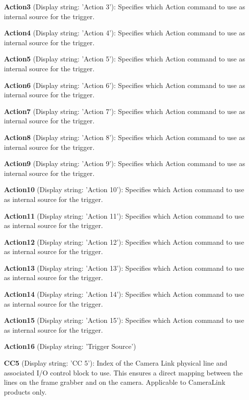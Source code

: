 \begin{DoxyItemize}
\item {\bfseries Action3} (Display string\+: 'Action 3')\+: Specifies which Action command to use as internal source for the trigger.
\item {\bfseries Action4} (Display string\+: 'Action 4')\+: Specifies which Action command to use as internal source for the trigger.
\item {\bfseries Action5} (Display string\+: 'Action 5')\+: Specifies which Action command to use as internal source for the trigger.
\item {\bfseries Action6} (Display string\+: 'Action 6')\+: Specifies which Action command to use as internal source for the trigger.
\item {\bfseries Action7} (Display string\+: 'Action 7')\+: Specifies which Action command to use as internal source for the trigger.
\item {\bfseries Action8} (Display string\+: 'Action 8')\+: Specifies which Action command to use as internal source for the trigger.
\item {\bfseries Action9} (Display string\+: 'Action 9')\+: Specifies which Action command to use as internal source for the trigger.
\item {\bfseries Action10} (Display string\+: 'Action 10')\+: Specifies which Action command to use as internal source for the trigger.
\item {\bfseries Action11} (Display string\+: 'Action 11')\+: Specifies which Action command to use as internal source for the trigger.
\item {\bfseries Action12} (Display string\+: 'Action 12')\+: Specifies which Action command to use as internal source for the trigger.
\item {\bfseries Action13} (Display string\+: 'Action 13')\+: Specifies which Action command to use as internal source for the trigger.
\item {\bfseries Action14} (Display string\+: 'Action 14')\+: Specifies which Action command to use as internal source for the trigger.
\item {\bfseries Action15} (Display string\+: 'Action 15')\+: Specifies which Action command to use as internal source for the trigger.
\item {\bfseries Action16} (Display string\+: 'Trigger Source')
\item {\bfseries C\+C5} (Display string\+: 'C\+C 5')\+: Index of the Camera Link physical line and associated I/\+O control block to use. This ensures a direct mapping between the lines on the frame grabber and on the camera. Applicable to Camera\+Link products only.

\end{DoxyItemize}
